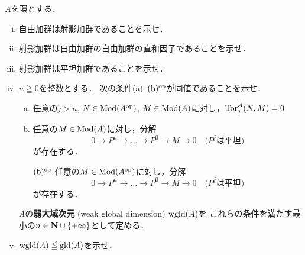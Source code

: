 \begin{leftbar}
\begin{EXC}[弱大域次元]\label{EXC129}
    \(A\)を環とする．
    \begin{enumerate}[(i)]
        \item 自由加群は射影加群であることを示せ．
        \item 射影加群は自由加群の自由加群の直和因子であることを示せ．
        \item 射影加群は平坦加群であることを示せ．
        \item \(n\geqq0\)を整数とする．
            次の条件(a)--\((\text{b})^{{\rm op}}\)が同値であることを示せ．
            \begin{enumerate}[(a)]
                \item 任意の\(j>n\), \(N\in\mathop{\mathrm{Mod}}\nolimits(A^{\rm op})\), 
                \(M\in\mathop{\mathrm{Mod}}\nolimits(A)\)に対し，\(\mathop{\mathrm{Tor}}\nolimits_j^A(N,M)=0\)
                \item 任意の\(M\in\mathop{\mathrm{Mod}}\nolimits(A)\)に対し，分解\[
                    0\to P^n\to\dots\to P^0\to M\to0\quad\text{(\(P^j\)は平坦)}
                    \]が存在する．
                \item[\((\text{b})^{{\rm op}}\)]\setlength{\leftskip}{10pt}
                任意の\(M\in\mathop{\mathrm{Mod}}\nolimits(A^{\rm op})\)に対し，分解\[
                    0\to P^n\to\dots\to P^0\to M\to0\quad\text{(\(P^j\)は平坦)}
                \]が存在する．
            \end{enumerate}
            \(A\)の\textbf{弱大域次元} (weak global dimension) \(\mathop{\mathrm{wgld}}\nolimits(A)\)を
            これらの条件を満たす最小の\(n\in\mathbf{N}\cup\{+\infty\}\)として定める．
        \item \(\mathop{\mathrm{wgld}}\nolimits(A)\leqq\mathop{\mathrm{gld}}\nolimits(A)\)を示せ．
    \end{enumerate}
\end{EXC}
\end{leftbar}
